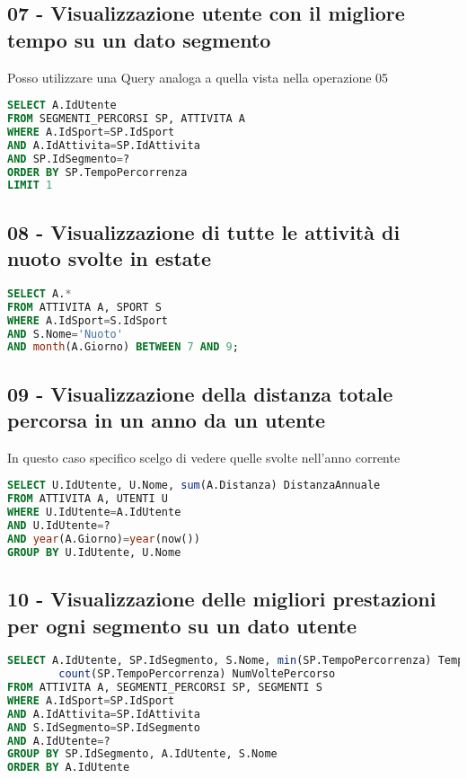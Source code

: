\documentclass[12pt]{report}
\begin{document}
\subsection*{07 - Visualizzazione utente con il migliore tempo su un dato segmento}
Posso utilizzare una Query analoga a quella vista nella operazione 05
\begin{lstlisting}[style=sql, language=SQL, label=lst:sql-query]
SELECT A.IdUtente
FROM SEGMENTI_PERCORSI SP, ATTIVITA A
WHERE A.IdSport=SP.IdSport
AND A.IdAttivita=SP.IdAttivita
AND SP.IdSegmento=?
ORDER BY SP.TempoPercorrenza
LIMIT 1
\end{lstlisting}


\subsection*{08 - Visualizzazione di tutte le attività di nuoto svolte in estate}
\begin{lstlisting}[style=sql, language=SQL, label=lst:sql-query]
SELECT A.*
FROM ATTIVITA A, SPORT S
WHERE A.IdSport=S.IdSport
AND S.Nome='Nuoto'
AND month(A.Giorno) BETWEEN 7 AND 9;
\end{lstlisting}


\subsection*{09 - Visualizzazione della distanza totale percorsa in un anno da
un utente}
In questo caso specifico scelgo di vedere quelle svolte nell'anno corrente
\begin{lstlisting}[style=sql, language=SQL, label=lst:sql-query]
SELECT U.IdUtente, U.Nome, sum(A.Distanza) DistanzaAnnuale
FROM ATTIVITA A, UTENTI U
WHERE U.IdUtente=A.IdUtente
AND U.IdUtente=?
AND year(A.Giorno)=year(now())
GROUP BY U.IdUtente, U.Nome
\end{lstlisting}


\subsection*{10 - Visualizzazione delle migliori prestazioni per ogni segmento
su un dato utente}
\begin{lstlisting}[style=sql, language=SQL, label=lst:sql-query]
SELECT A.IdUtente, SP.IdSegmento, S.Nome, min(SP.TempoPercorrenza) TempoMinimo, 
        count(SP.TempoPercorrenza) NumVoltePercorso
FROM ATTIVITA A, SEGMENTI_PERCORSI SP, SEGMENTI S
WHERE A.IdSport=SP.IdSport
AND A.IdAttivita=SP.IdAttivita
AND S.IdSegmento=SP.IdSegmento
AND A.IdUtente=?
GROUP BY SP.IdSegmento, A.IdUtente, S.Nome
ORDER BY A.IdUtente
\end{lstlisting}
\end{document}
